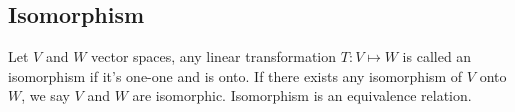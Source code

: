 \documentclass[../../../main.tex]{subfiles}
\begin{document}
\subsection{Isomorphism}
Let $V$ and $W$ vector spaces, any linear transformation $T:V\mapsto W$ is called an isomorphism if it's one-one and is onto. If there exists any isomorphism of $V$ onto $W$, we say $V$ and $W$ are isomorphic. Isomorphism is an equivalence relation.
\end{document}
